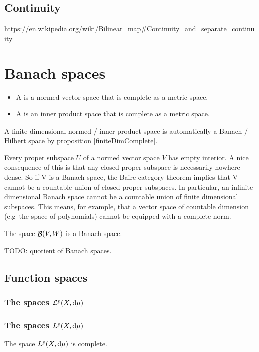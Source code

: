\section{Continuity}
\url{https://en.wikipedia.org/wiki/Bilinear_map#Continuity_and_separate_continuity}







\chapter{Banach spaces}
\begin{definition}
\begin{itemize}
\item A  is a normed vector space that is complete as a metric space.
\item A  is an inner product space that is complete as a metric space.
\end{itemize}
\end{definition}

A finite-dimensional normed / inner product space is automatically a Banach / Hilbert space by proposition \ref{finiteDimComplete}.

Every proper subspace $U$ of a normed vector space $V$ has empty interior.
A nice consequence of this is that any closed proper subspace is necessarily nowhere dense. So if V is a Banach space, the Baire category theorem implies that V cannot be a countable union of closed proper subspaces. In particular, an infinite dimensional Banach space cannot be a countable union of finite dimensional subspaces. This means, for example, that a vector space of countable dimension (e.g\ the space of polynomials) cannot be equipped with a complete norm.

The space $\mathop{\mathcal{B}}(V,W)$ is a Banach space.

TODO: quotient of Banach spaces.

\section{Function spaces}
\subsection{The spaces $\mathcal{L}^p(X,\operatorname{d \!}{\mu})$}
\subsection{The spaces $L^p(X,\operatorname{d \!}{\mu})$}
\begin{theorem}
The space $L^p(X,\operatorname{d \!}{\mu})$ is complete.
\end{theorem}

